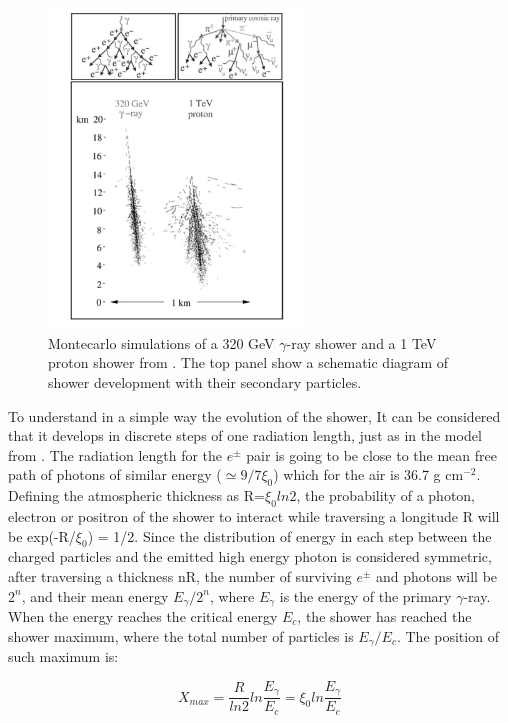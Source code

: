 \documentclass[main.tex]{subfiles}
\begin{document}
 \begin{figure}[h]
    \centering
    \includegraphics[width=0.6\textwidth]{Pictures/eas.pdf}
    \caption{Montecarlo simulations of a 320 GeV $\gamma$-ray shower and a 1 TeV proton shower from \cite{weekes2003HEAstrophy}. The top panel show a schematic diagram of shower development with their secondary particles.}
    \label{fig:EAS}
    \end{figure}

To understand in a simple way the evolution of the shower, It can be considered that it develops in discrete steps of one radiation length, just as in the model from \cite{1954Heitler}. The radiation length for the $e^\pm$ pair is going to be close to the mean free path of photons of similar energy ($\simeq 9/7 \xi_{0}$) which for the air is 36.7 g cm$^{-2}$. Defining the atmospheric thickness as R=$\xi_{0}ln2$, the probability of a photon, electron or positron of the shower to interact while traversing a longitude R will be exp(-R/$\xi_{0}$) = 1/2. Since the distribution of energy in each step between the charged particles and the emitted high energy photon is considered symmetric, after traversing a thickness nR, the number of surviving $e^\pm$ and photons will be $2^n$, and their mean energy $E_{\gamma}/2^{n}$, where $E_\gamma$ is the energy of the primary $\gamma$-ray. When the energy reaches the critical energy $E_c$, the shower has reached the shower maximum, where the total number of particles is $E_{\gamma}/E_c$. The position of such maximum is:

\begin{equation} \label{eq:xmax}
    X_{max} = \frac{R}{ln 2} ln \frac{E_{\gamma}}{E_c} = \xi_0 ln \frac{E_{\gamma}}{E_c}
\end{equation}
\end{document}
